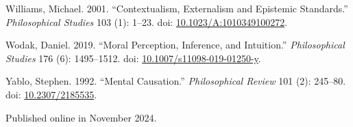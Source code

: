 \documentclass[
  10pt,
  letterpaper,
  DIV=11,
  numbers=noendperiod,
  twoside]{scrartcl}
\newlength{\cslhangindent}
\newenvironment{CSLReferences}[2] %
 {\begin{list}{}{%
  \setlength{\itemindent}{0pt}
  \setlength{\leftmargin}{0pt}
  \setlength{\parsep}{0pt}
  \ifodd #1
   \setlength{\leftmargin}{\cslhangindent}
   \setlength{\itemindent}{-1\cslhangindent}
  \fi
  \setlength{\itemsep}{#2\baselineskip}}}
 {\end{list}}
\begin{document}
\begin{CSLReferences}{1}{0}
Williams, Michael. 2001. {``Contextualism, Externalism and Epistemic
Standards.''} \emph{Philosophical Studies} 103 (1): 1--23. doi:
\href{https://doi.org/10.1023/A:1010349100272}{10.1023/A:1010349100272}.

Wodak, Daniel. 2019. {``Moral Perception, Inference, and Intuition.''}
\emph{Philosophical Studies} 176 (6): 1495--1512. doi:
\href{https://doi.org/10.1007/s11098-019-01250-y}{10.1007/s11098-019-01250-y}.

Yablo, Stephen. 1992. {``Mental Causation.''} \emph{Philosophical
Review} 101 (2): 245--80. doi:
\href{https://doi.org/10.2307/2185535}{10.2307/2185535}.

\end{CSLReferences}



\noindent Published online in November 2024.
\end{document}

